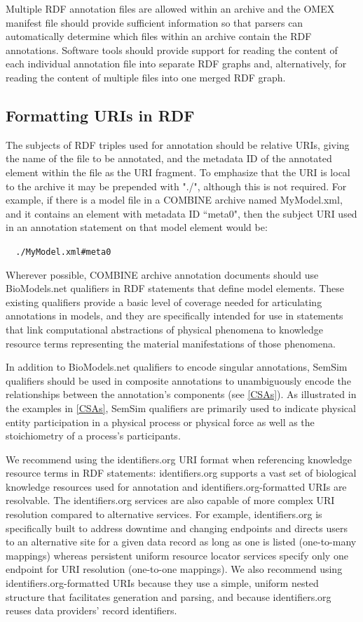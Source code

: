 \documentclass[pdftex,rgb,dvipsnames,svgnames,hyperref,table]{report}
\begin{document}
Multiple RDF annotation files are allowed within an archive and the OMEX manifest file should provide sufficient information so that parsers can automatically determine which files within an archive contain the RDF annotations. Software tools should provide support for reading the content of each individual annotation file into separate RDF graphs and, alternatively, for reading the content of multiple files into one merged RDF graph.


\subsection{Formatting URIs in RDF}
The subjects of RDF triples used for annotation should be relative URIs, giving the name of the file to be annotated, and the metadata ID of the annotated element within the file as the URI fragment. To emphasize that the URI is local to the archive it may be prepended with "./", although this is not required. For example, if there is a model file in a COMBINE archive named MyModel.xml, and it contains an element with metadata ID ``meta0", then the subject URI used in an annotation statement on that model element would be:

\verb|  ./MyModel.xml#meta0|

Wherever possible, COMBINE archive annotation documents should use BioModels.net qualifiers in RDF statements that define model elements. These existing qualifiers provide a basic level of coverage needed for articulating annotations in models, and they are specifically intended for use in statements that link computational abstractions of physical phenomena to knowledge resource terms representing the material manifestations of those phenomena. 

In addition to BioModels.net qualifiers to encode singular annotations, SemSim qualifiers should be used in composite annotations to unambiguously encode the relationships between the annotation's components (see \ref{CSAs}). As illustrated in the examples in \ref{CSAs}, SemSim qualifiers are primarily used to indicate physical entity participation in a physical process or physical force as well as the stoichiometry of a process's participants.

We recommend using the identifiers.org URI format when referencing knowledge resource terms in RDF statements: identifiers.org supports a vast set of biological knowledge resources used for annotation and identifiers.org-formatted URIs are resolvable. The identifiers.org services are also capable of more complex URI resolution compared to alternative services. For example, identifiers.org is specifically built to address downtime and changing endpoints and directs users to an alternative site for a given data record as long as one is listed (one-to-many mappings) whereas persistent uniform resource locator services specify only one endpoint for URI resolution (one-to-one mappings). We also recommend using identifiers.org-formatted URIs because they use a simple, uniform nested structure that facilitates generation and parsing, and because identifiers.org reuses data providers’ record identifiers.
\end{document}
